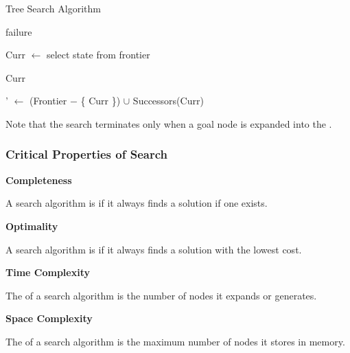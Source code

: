 \begin{algorithm}
    \caption{Tree Search Algorithm}

    \begin{algorithmic}[1]
                \State \Return failure
            \EndIf

            \State Curr $\gets$ select state from frontier

                \State \Return Curr
            \EndIf

            \State \Frontier' $\gets$ (Frontier $-$ \{ Curr \}) $\cup$ Successors(Curr)

            \State \Return {}
        \EndFunction
    \end{algorithmic}
\end{algorithm}


Note that the search terminates only when a goal node is expanded into the \Frontier.

\subsubsection{Critical Properties of Search}

\begin{listu}
    \item \textbf{Completeness}

    \begin{listu}
        \item A search algorithm is  if it always finds a solution if one exists.
    \end{listu}

    \item \textbf{Optimality}

    \begin{listu}
        \item A search algorithm is  if it always finds a solution with the lowest cost.
    \end{listu}

    \item \textbf{Time Complexity}

    \begin{listu}
        \item The  of a search algorithm is the number of nodes it expands or generates.
    \end{listu}

    \item \textbf{Space Complexity}

    \begin{listu}
        \item The  of a search algorithm is the maximum number of nodes it stores in memory.
    \end{listu}
\end{listu}

